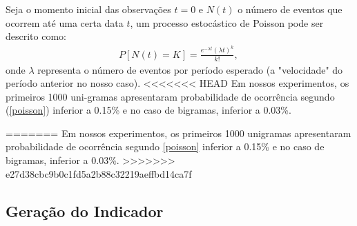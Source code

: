 \documentclass[paper=a4, fontsize=11pt]{scrartcl}
\numberwithin{equation}{section}		%
\numberwithin{figure}{section}			%
\numberwithin{table}{section}				%
\begin{document}
Seja o momento inicial das observações $t=0$ e $N(t)$ o número de eventos que ocorrem até uma certa data $t$, um processo estocástico de Poisson pode ser descrito como:
\begin{align}
	P[N(t)=K]=\frac{e^{-\lambda t} (\lambda t )^k}{k!},\,\! \label{poisson}
\end{align}
onde $\lambda$ representa o número de eventos por período esperado (a "velocidade"  do período anterior no nosso caso).
<<<<<<< HEAD
Em nossos experimentos, os primeiros 1000 uni-gramas apresentaram probabilidade de ocorrência segundo (\ref{poisson}) inferior a 0.15\% e no caso de bigramas, inferior a 0.03\%.

=======
Em nossos experimentos, os primeiros 1000 unigramas apresentaram probabilidade de ocorrência segundo \ref{poisson} inferior a 0.15\% e no caso de bigramas, inferior a 0.03\%.
>>>>>>> e27d38cbc9b0c1fd5a2b88c32219aeffbd14ca7f
\subsection{Geração do Indicador}
\end{document}
